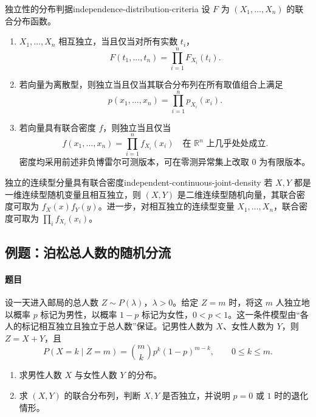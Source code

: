 \begin{mytheorem}{独立性的分布判据}{independence-distribution-criteria}
设 $F$ 为 $(X_1,\ldots,X_n)$ 的联合分布函数。
\begin{enumerate}
\item $X_1,\ldots,X_n$ 相互独立，当且仅当对所有实数 $t_i$，
\[
F(t_1,\ldots,t_n)=\prod_{i=1}^nF_{X_i}(t_i).
\]
\item 若向量为离散型，则独立当且仅当其联合分布列在所有取值组合上满足
\[
p(x_1,\ldots,x_n)=\prod_{i=1}^np_{X_i}(x_i).
\]
\item 若向量具有联合密度 $f$，则独立当且仅当
\[
f(x_1,\ldots,x_n)=\prod_{i=1}^nf_{X_i}(x_i)
\quad\text{在 }\mathbb R^n\text{ 上几乎处处成立}.
\]
密度均采用前述非负博雷尔可测版本，可在零测异常集上改取 $0$ 为有限版本。
\end{enumerate}
\end{mytheorem}

\begin{mycorollary}{独立的连续型分量具有联合密度}{independent-continuous-joint-density}
若 $X,Y$ 都是一维连续型随机变量且相互独立，则 $(X,Y)$ 是二维连续型随机向量，其联合密度可取为 $f_X(x)f_Y(y)$。进一步，对相互独立的连续型变量 $X_1,\ldots,X_n$，联合密度可取为 $\prod_i f_{X_i}(x_i)$。
\end{mycorollary}

\subsection{例题：泊松总人数的随机分流}\label{note:c3:e7}
\paragraph{题目}
设一天进入邮局的总人数 $Z\sim P(\lambda)$，$\lambda>0$。给定 $Z=m$ 时，将这 $m$ 人独立地以概率 $p$ 标记为男性，以概率 $1-p$ 标记为女性，$0<p<1$。这一条件模型由“各人的标记相互独立且独立于总人数”保证。记男性人数为 $X$、女性人数为 $Y$，则 $Z=X+Y$，且
\[
P(X=k\mid Z=m)=\binom mkp^k(1-p)^{m-k},\qquad 0\leq k\leq m.
\]
\begin{enumerate}
\item 求男性人数 $X$ 与女性人数 $Y$ 的分布。

\item 求 $(X,Y)$ 的联合分布列，判断 $X,Y$ 是否独立，并说明 $p=0$ 或 $1$ 时的退化情形。
\end{enumerate}

